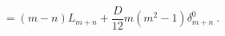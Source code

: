 \begin{equation}
[L_{m} , L_{n}] = (m-n) L_{m+n} + \frac{D}{12} m (m^{2}-1)
\delta^{0}_{m+n}~. 
\end{equation}

